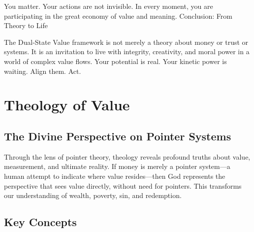 \documentclass[11pt,oneside]{book}
\begin{document}
You matter. Your actions are not invisible. In every moment, you are participating in the great economy of value and meaning.
Conclusion: From Theory to Life

The Dual-State Value framework is not merely a theory about money or trust or systems. It is an invitation to live with integrity, creativity, and moral power in a world of complex value flows. Your potential is real. Your kinetic power is waiting. Align them. Act.


\chapter{Theology of Value}

\section{The Divine Perspective on Pointer Systems}

Through the lens of pointer theory, theology reveals profound truths about value, measurement, and ultimate reality. If money is merely a pointer system—a human attempt to indicate where value resides—then God represents the perspective that sees value directly, without need for pointers. This transforms our understanding of wealth, poverty, sin, and redemption.

\section{Key Concepts}
\end{document}
